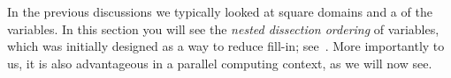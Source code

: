 

In the previous discussions we typically looked at square domains
and a  of the variables.
In this section you will see the \emph{nested dissection ordering}
of variables, which was
initially designed as a way to reduce fill-in; see~\cite{Geo73}.
More importantly to us, it is also
advantageous in a parallel computing context,
as we will now see.

